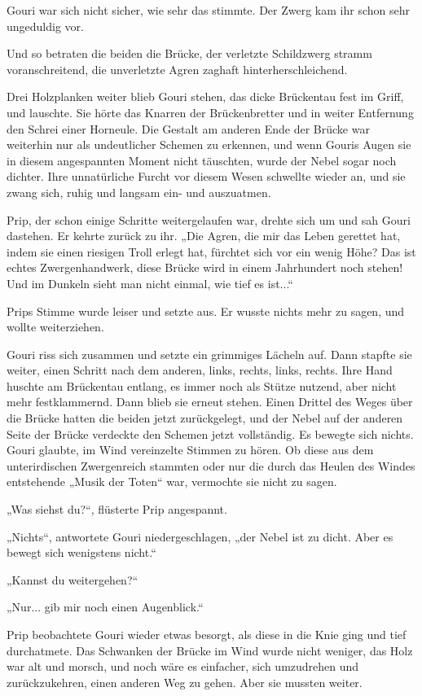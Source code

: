 Gouri war sich nicht sicher, wie sehr das stimmte. Der Zwerg kam ihr schon sehr ungeduldig vor.

Und so betraten die beiden die Brücke, der verletzte Schildzwerg stramm voranschreitend, die unverletzte Agren zaghaft hinterherschleichend.

Drei Holzplanken weiter blieb Gouri stehen, das dicke Brückentau fest im Griff, und lauschte. Sie hörte das Knarren der Brückenbretter und in weiter Entfernung den Schrei einer Horneule. Die Gestalt am anderen Ende der Brücke war weiterhin nur als undeutlicher Schemen zu erkennen, und wenn Gouris Augen sie in diesem angespannten Moment nicht täuschten, wurde der Nebel sogar noch dichter. Ihre unnatürliche Furcht vor diesem Wesen schwellte wieder an, und sie zwang sich, ruhig und langsam ein- und auszuatmen.

Prip, der schon einige Schritte weitergelaufen war, drehte sich um und sah Gouri dastehen. Er kehrte zurück zu ihr. „Die Agren, die mir das Leben gerettet hat, indem sie einen riesigen Troll erlegt hat, fürchtet sich vor ein wenig Höhe? Das ist echtes Zwergenhandwerk, diese Brücke wird in einem Jahrhundert noch stehen! Und im Dunkeln sieht man nicht einmal, wie tief es ist...“

Prips Stimme wurde leiser und setzte aus. Er wusste nichts mehr zu sagen, und wollte weiterziehen.

Gouri riss sich zusammen und setzte ein grimmiges Lächeln auf. Dann stapfte sie weiter, einen Schritt nach dem anderen, links, rechts, links, rechts. Ihre Hand huschte am Brückentau entlang, es immer noch als Stütze nutzend, aber nicht mehr festklammernd. Dann blieb sie erneut stehen. Einen Drittel des Weges über die Brücke hatten die beiden jetzt zurückgelegt, und der Nebel auf der anderen Seite der Brücke verdeckte den Schemen jetzt vollständig. Es bewegte sich nichts. Gouri glaubte, im Wind vereinzelte Stimmen zu hören. Ob diese aus dem unterirdischen Zwergenreich stammten oder nur die durch das Heulen des Windes entstehende „Musik der Toten“ war, vermochte sie nicht zu sagen.

„Was siehst du?“, flüsterte Prip angespannt.

„Nichts“, antwortete Gouri niedergeschlagen, „der Nebel ist zu dicht. Aber es bewegt sich wenigstens nicht.“

„Kannst du weitergehen?“

„Nur... gib mir noch einen Augenblick.“

Prip beobachtete Gouri wieder etwas besorgt, als diese in die Knie ging und tief durchatmete. Das Schwanken der Brücke im Wind wurde nicht weniger, das Holz war alt und morsch, und noch wäre es einfacher, sich umzudrehen und zurückzukehren, einen anderen Weg zu gehen. Aber sie mussten weiter.

